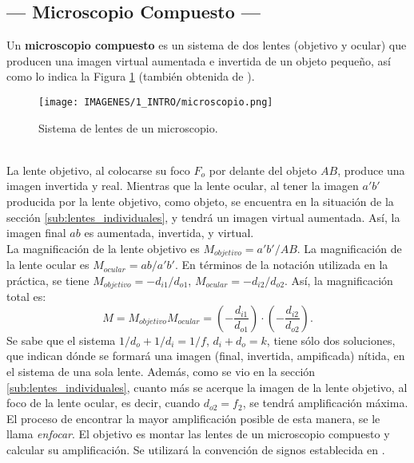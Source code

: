 \documentclass[10pt,a4paper]{article}
\begin{document}
\subsection{--- Microscopio Compuesto ---} %
\label{sub:microscopio_compuesto}
Un \textbf{microscopio compuesto} es un sistema de dos lentes (objetivo y ocular) que producen una imagen virtual aumentada e invertida de un objeto pequeño, así como lo indica la Figura \ref{fig:microscopio} (también obtenida de ).
\begin{figure}[ht]
	\centering
	\texttt{[image: IMAGENES/1\_INTRO/microscopio.png]}
	\caption{Sistema de lentes de un microscopio.}
	\label{fig:microscopio}
\end{figure}\\
La lente objetivo, al colocarse su foco \(F_o\) por delante del objeto \(AB\), produce una imagen invertida y real.
Mientras que la lente ocular, al tener la imagen \(a'b'\) producida por la lente objetivo, como objeto, se encuentra en la situación de la sección \ref{sub:lentes_individuales}, y tendrá un imagen virtual aumentada.
Así, la imagen final \(ab\) es aumentada, invertida, y virtual.\\

La magnificación de la lente objetivo es \(M_{objetivo} = a'b' /AB\).
La magnificación de la lente ocular es \(M_{ocular} = ab/a'b'\).
En términos de la notación utilizada en la práctica, se tiene \(M_{objetivo} = -d_{i1} /d_{o1}\), \(M_{ocular} = -d_{i2} / d_{o2}\).
Así, la magnificación total es:
\begin{equation}
	M = M_{objetivo} M_{ocular} = \left(-\dfrac{d_{i1}}{d_{o1}} \right)\cdot \left(-\dfrac{d_{i2}}{d_{o2}}\right).
	\label{eq:magnificacion_final}
\end{equation}
Se sabe que el sistema \(1/d_o+1/d_i=1/f\), \(d_i+d_o=k\), tiene sólo dos soluciones, que indican dónde se formará una imagen (final, invertida, ampificada) nítida, en el sistema de una sola lente.
Además, como se vio en la sección \ref{sub:lentes_individuales}, cuanto más se acerque la imagen de la lente objetivo, al foco de la lente ocular, es decir, cuando \(d_{o2} =f_2\), se tendrá amplificación máxima. El proceso de encontrar la mayor amplificación posible de esta manera, se le llama \textit{enfocar}. El objetivo es montar las lentes de un microscopio compuesto y calcular su amplificación. Se utilizará la convención de signos establecida en .
\end{document}

